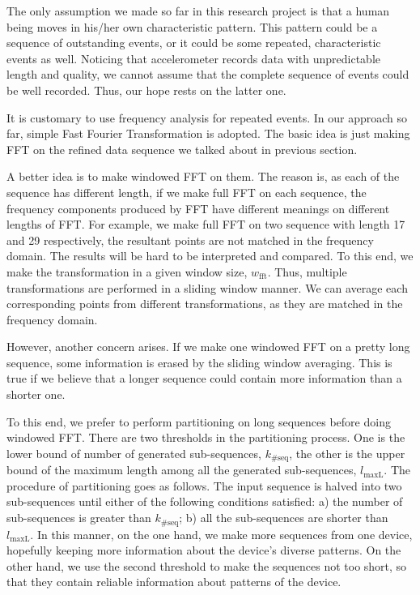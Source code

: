 \documentclass{article} %
\begin{document}
The only assumption we made so far in this research project is that a human being moves in his/her own characteristic pattern. This pattern could be a sequence of outstanding events, or it could be some repeated, characteristic events as well. Noticing that accelerometer records data with unpredictable length and quality, we cannot assume that the complete sequence of events could be well recorded. Thus, our hope rests on the latter one. 

It is customary to use frequency analysis for repeated events. In our approach so far, simple Fast Fourier Transformation is adopted. The basic idea is just making FFT on the refined data sequence we talked about in previous section.

A better idea is to make windowed FFT on them. The reason is, as each of the sequence has different length, if we make full FFT on each sequence, the frequency components produced by FFT have different meanings on different lengths of FFT. For example, we make full FFT on two sequence with length 17 and 29 respectively, the resultant points are not matched in the frequency domain. The results will be hard to be interpreted and compared. To this end, we make the transformation in a given window size, $w_\mathrm{fft}$. Thus, multiple transformations are performed in a sliding window manner. We can average each corresponding points from different transformations, as they are matched in the frequency domain. 

However, another concern arises. If we make one windowed FFT on a pretty long sequence, some information is erased by the sliding window averaging. This is true if we believe that a longer sequence could contain more information than a shorter one.

To this end, we prefer to perform partitioning on long sequences before doing windowed FFT. There are two thresholds in the partitioning process. One is the lower bound of number of generated sub-sequences, $k_\mathrm{\#seq}$, the other is the upper bound of the maximum length among all the generated sub-sequences, $l_\mathrm{maxL}$. The procedure of partitioning goes as follows. The input sequence is halved into two sub-sequences until either of the following conditions satisfied: a) the number of sub-sequences is greater than $k_\mathrm{\#seq}$; b) all the sub-sequences are shorter than $l_\mathrm{maxL}$. In this manner, on the one hand, we make more sequences from one device, hopefully keeping more information about the device's diverse patterns. On the other hand, we use the second threshold to make the sequences not too short, so that they contain reliable information about patterns of the device.
\end{document}

